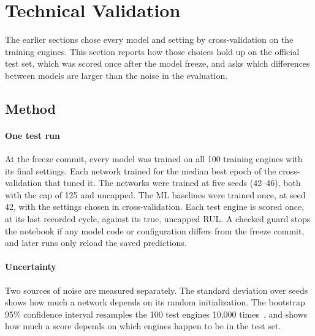 
\section{Technical Validation}
\label{sec:validation}

The earlier sections chose every model and setting by cross-validation on the
training engines. This section reports how those choices hold up on the
official test set, which was scored once after the model freeze, and asks
which differences between models are larger than the noise in the
evaluation.

\subsection{Method}
\paragraph{One test run}
At the freeze commit, every model was trained on all 100 training engines
with its final settings. Each network trained for the median best epoch of
the cross-validation that tuned it. The networks were trained at five seeds
(42--46), both with the cap of 125 and uncapped. The ML baselines were trained
once, at seed 42, with the settings chosen in cross-validation. Each test
engine is scored once, at its last recorded cycle, against its true, uncapped
RUL. A checked guard stops the notebook if any model code or configuration
differs from the freeze commit, and later runs only reload the saved
predictions.

\paragraph{Uncertainty}
Two sources of noise are measured separately. The standard deviation over
seeds shows how much a network depends on its random initialization. The
bootstrap 95\% confidence interval resamples the 100 test engines 10{,}000
times~\cite{Efron1993introduction}, and shows how much a score depends on
which engines happen to be in the test set.

